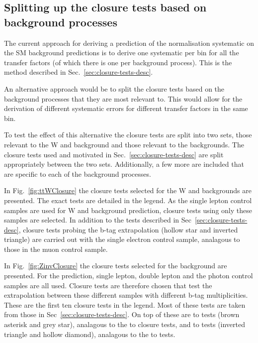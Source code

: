 
\subsection{Splitting up the closure tests based on background
processes \label{sec:closure-split}}

The current approach for deriving a prediction of the normalisation systematic
on the SM background predictions is to derive one systematic per bin
for all the transfer factors (of which there is one per background process). This is the 
method described in Sec.~\ref{sec:closure-tests-desc}.

An alternative approach would be to split the closure tests based on
the background processes that they are most relevant to. This would
allow for the derivation of different systematic errors for different
transfer factors in the same bin.

To test the effect of this alternative the closure tests are split into
two sets, those relevant to the W and \ttbar background and those relevant
to the \znunu backgrounds. The closure tests used and motivated in
Sec.~\ref{sec:closure-tests-desc} are split appropriately between the
two sets. Additionally, a few more are included that are specific to each of
the background processes.

In Fig.~\ref{fig:ttWClosure} the closure tests selected for the W and
\ttbar backgrounds are presented. The exact tests are detailed
in the legend. As the single lepton control samples are used for W and
\ttbar background prediction, closure tests using only these samples
are selected. In addition to the tests described in
Sec~\ref{sec:closure-tests-desc}, closure tests probing the b-tag
extrapolation (hollow star and inverted triangle) are carried out with 
the single electron control sample, analagous to those in the muon control sample.

In Fig.~\ref{fig:ZinvClosure} the closure tests selected for the
\znunu background are presented. For the \znunu prediction, single
lepton, double lepton and the photon control samples are all used.
Closure tests are therefore chosen that test the extrapolation
between these different samples with different b-tag multiplicities. 
These are the first ten closure tests in the legend. Most of these
tests are taken from those in Sec~\ref{sec:closure-tests-desc}. On top
of these are \mmj to \gj tests (brown asterisk and grey star), analagous to
the \eej to \gj closure tests, and \ej to \eej tests (inverted
triangle and hollow diamond), analagous to the \mj to \mmj tests.


